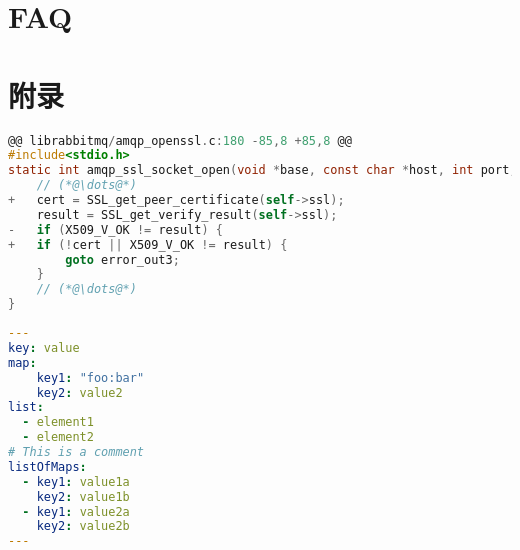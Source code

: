 \documentclass{sixpage}
\begin{document}
    \section{FAQ} %


    \newpage


    \section{附录} %

\begin{lstlisting}[language=C,caption=casdcasdc code,style=diff]
@@ librabbitmq/amqp_openssl.c:180 -85,8 +85,8 @@
#include<stdio.h>
static int amqp_ssl_socket_open(void *base, const char *host, int port, struct timeval *timeout) {
	// (*@\dots@*)
+	cert = SSL_get_peer_certificate(self->ssl);
	result = SSL_get_verify_result(self->ssl);
-	if (X509_V_OK != result) {
+	if (!cert || X509_V_OK != result) {
		goto error_out3;
	}
	// (*@\dots@*)
}
\end{lstlisting}

\begin{lstlisting}[language=yaml,caption=yaml example]
---
key: value
map:
    key1: "foo:bar"
    key2: value2
list:
  - element1
  - element2
# This is a comment
listOfMaps:
  - key1: value1a
    key2: value1b
  - key1: value2a
    key2: value2b
---
\end{lstlisting}
\end{document}

